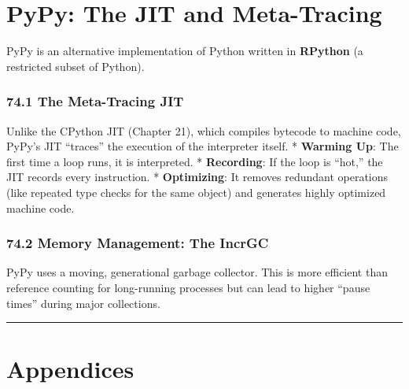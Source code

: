 \hypertarget{pypy-the-jit-and-meta-tracing}{%
\chapter{PyPy: The JIT and
Meta-Tracing}\label{pypy-the-jit-and-meta-tracing}}

PyPy is an alternative implementation of Python written in
\textbf{RPython} (a restricted subset of Python).

\hypertarget{the-meta-tracing-jit}{%
\subsection{74.1 The Meta-Tracing JIT}\label{the-meta-tracing-jit}}

Unlike the CPython JIT (Chapter 21), which compiles bytecode to machine
code, PyPy's JIT ``traces'' the execution of the interpreter itself. *
\textbf{Warming Up}: The first time a loop runs, it is interpreted. *
\textbf{Recording}: If the loop is ``hot,'' the JIT records every
instruction. * \textbf{Optimizing}: It removes redundant operations
(like repeated type checks for the same object) and generates highly
optimized machine code.

\hypertarget{memory-management-the-incrgc}{%
\subsection{74.2 Memory Management: The
IncrGC}\label{memory-management-the-incrgc}}

PyPy uses a moving, generational garbage collector. This is more
efficient than reference counting for long-running processes but can
lead to higher ``pause times'' during major collections.

\begin{center}\rule{0.5\linewidth}{0.5pt}\end{center}

\hypertarget{appendices}{%
\chapter{Appendices}\label{appendices}}
